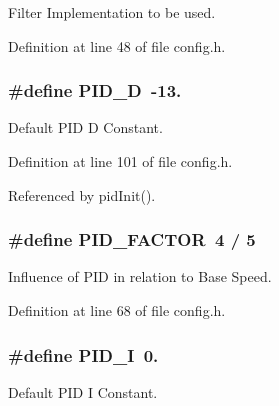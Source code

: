 Filter Implementation to be used. 



Definition at line 48 of file config.\-h.

\hypertarget{group__config_ga2a442b8579a5c5f9526e824165125497}{
\subsubsection[{P\-I\-D\-\_\-\-D}]{\setlength{\rightskip}{0pt plus 5cm}\#define P\-I\-D\-\_\-\-D~-\/13.}}\label{group__config_ga2a442b8579a5c5f9526e824165125497}


Default P\-I\-D D Constant. 



Definition at line 101 of file config.\-h.



Referenced by pid\-Init().

\hypertarget{group__config_ga0eb032986beceb6759aebd761c35a879}{
\subsubsection[{P\-I\-D\-\_\-\-F\-A\-C\-T\-O\-R}]{\setlength{\rightskip}{0pt plus 5cm}\#define P\-I\-D\-\_\-\-F\-A\-C\-T\-O\-R~4 / 5}}\label{group__config_ga0eb032986beceb6759aebd761c35a879}


Influence of P\-I\-D in relation to Base Speed. 



Definition at line 68 of file config.\-h.

\hypertarget{group__config_ga2dfd5fcf8dd0bee1de9007fe8e161886}{
\subsubsection[{P\-I\-D\-\_\-\-I}]{\setlength{\rightskip}{0pt plus 5cm}\#define P\-I\-D\-\_\-\-I~0.}}\label{group__config_ga2dfd5fcf8dd0bee1de9007fe8e161886}


Default P\-I\-D I Constant. 



